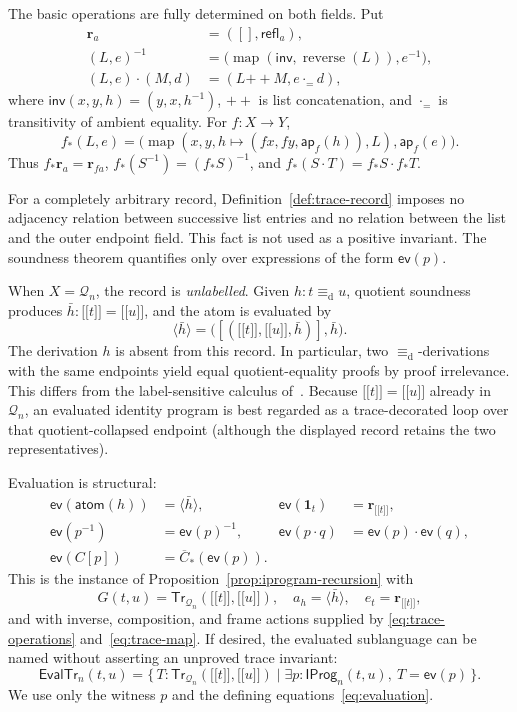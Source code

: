 \documentclass[10pt,reqno]{amsart}
\newcommand{\Tr}{\mathsf{Tr}}
\newcommand{\IProg}{\mathsf{IProg}}
\newcommand{\ev}{\mathsf{ev}}
\newcommand{\den}[1]{\mathopen{\lbrack\!\lbrack}#1\mathclose{\rbrack\!\rbrack}}
\newcommand{\defeq}{\mathrel{\equiv_{\mathrm d}}}
\newcommand{\Q}{\mathcal{Q}}
\begin{document}
The basic operations are fully determined on both fields.  Put
\[
\begin{aligned}
\mathbf r_a&=([],\mathsf{refl}_a),\\
(L,e)^{-1}
  &=\bigl(\operatorname{map}(\mathsf{inv},
       \operatorname{reverse}(L)),e^{-1}\bigr),\\
(L,e)\cdot(M,d)&=(L{+\!\!+}M,e\mathbin{\cdot_{=}}d),
\end{aligned}
\tag{8.7}\label{eq:trace-operations}
\]
where
\(\mathsf{inv}(x,y,h)=(y,x,h^{-1})\), \(+\!\!+\) is list
concatenation, and \(\cdot_{=}\) is transitivity of ambient equality.
For \(f:X\to Y\),
\[
 f_\ast(L,e)=
 \bigl(\operatorname{map}(x,y,h\mapsto
       (fx,fy,\mathsf{ap}_f(h)),L),\mathsf{ap}_f(e)\bigr).
\tag{8.8}\label{eq:trace-map}
\]
Thus \(f_\ast\mathbf r_a=\mathbf r_{fa}\),
\(f_\ast(S^{-1})=(f_\ast S)^{-1}\), and
\(f_\ast(S\cdot T)=f_\ast S\cdot f_\ast T\).

For a completely arbitrary record, Definition~\ref{def:trace-record} imposes
no adjacency relation between successive list entries and no relation between
the list and the outer endpoint field.  This fact is not used as a positive
invariant.  The soundness theorem quantifies only over expressions of the
form \(\ev(p)\).

When \(X=\Q_n\), the record is \emph{unlabelled}.  Given
\(h:t\defeq u\), quotient soundness produces
\(\bar h:\den t=\den u\), and the atom is evaluated by
\[
 \langle\bar h\rangle
 =\bigl([(\den t,\den u,\bar h)],\bar h\bigr).
\]
The derivation \(h\) is absent from this record.  In particular, two
\(\defeq\)-derivations with the same endpoints yield equal quotient-equality
proofs by proof irrelevance.  This differs from the label-sensitive calculus
of~\cite{deQueirozEtAl2016,RamosEtAl2017,RamosEtAl2018,RamosEtAl2026}.
Because \(\den t=\den u\) already in \(\Q_n\), an evaluated identity program
is best regarded as a trace-decorated loop over that quotient-collapsed
endpoint (although the displayed record retains the two representatives).

Evaluation is structural:
\[
\begin{aligned}
\ev(\mathsf{atom}(h))&=\langle\bar h\rangle,&
\ev(\mathbf{1}_t)&=\mathbf r_{\den t},\\
\ev(p^{-1})&=\ev(p)^{-1},&
\ev(p\cdot q)&=\ev(p)\cdot\ev(q),\\
\ev(C[p])&=\overline C_\ast(\ev(p)).
\end{aligned}
\tag{8.9}\label{eq:evaluation}
\]
This is the instance of Proposition~\ref{prop:iprogram-recursion} with
\[
 G(t,u)=\Tr_{\Q_n}(\den t,\den u),\quad
 a_h=\langle\bar h\rangle,\quad e_t=\mathbf r_{\den t},
\]
and with inverse, composition, and frame actions supplied by
\eqref{eq:trace-operations} and~\eqref{eq:trace-map}.
If desired, the evaluated sublanguage can be named without asserting an
unproved trace invariant:
\[
 \mathsf{EvalTr}_n(t,u)
   =\{\,T:\Tr_{\Q_n}(\den t,\den u)
        \mid \exists p:\IProg_n(t,u),\ T=\ev(p)\,\}.
\tag{8.10}\label{eq:evaluated-image}
\]
We use only the witness \(p\) and the defining equations~\eqref{eq:evaluation}.
\end{document}
